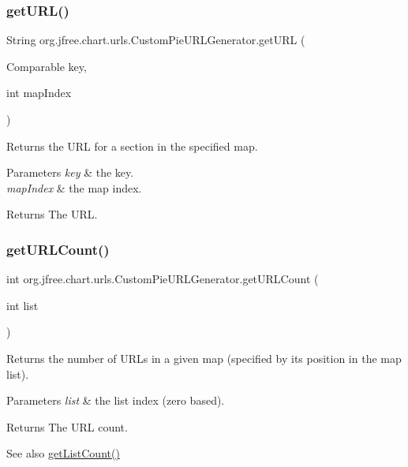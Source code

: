 \subsubsection{\texorpdfstring{get\+U\+R\+L()}{getURL()}}
{\footnotesize\ttfamily String org.\+jfree.\+chart.\+urls.\+Custom\+Pie\+U\+R\+L\+Generator.\+get\+U\+RL (\begin{DoxyParamCaption}\item[{Comparable}]{key,  }\item[{int}]{map\+Index }\end{DoxyParamCaption})}

Returns the U\+RL for a section in the specified map.


\begin{DoxyParams}{Parameters}
{\em key} & the key. \\
\hline
{\em map\+Index} & the map index.\\
\hline
\end{DoxyParams}
\begin{DoxyReturn}{Returns}
The U\+RL. 
\end{DoxyReturn}
\mbox{\label{classorg_1_1jfree_1_1chart_1_1urls_1_1_custom_pie_u_r_l_generator_adde3608853a6d2d98ae82673e3f65121}} 
\subsubsection{\texorpdfstring{get\+U\+R\+L\+Count()}{getURLCount()}}
{\footnotesize\ttfamily int org.\+jfree.\+chart.\+urls.\+Custom\+Pie\+U\+R\+L\+Generator.\+get\+U\+R\+L\+Count (\begin{DoxyParamCaption}\item[{int}]{list }\end{DoxyParamCaption})}

Returns the number of U\+R\+Ls in a given map (specified by its position in the map list).


\begin{DoxyParams}{Parameters}
{\em list} & the list index (zero based).\\
\hline
\end{DoxyParams}
\begin{DoxyReturn}{Returns}
The U\+RL count.
\end{DoxyReturn}
\begin{DoxySeeAlso}{See also}
\mbox{\hyperlink{classorg_1_1jfree_1_1chart_1_1urls_1_1_custom_pie_u_r_l_generator_ac351567812ec8a57390ae5dbb2d13027}{get\+List\+Count()}} 
\end{DoxySeeAlso}


